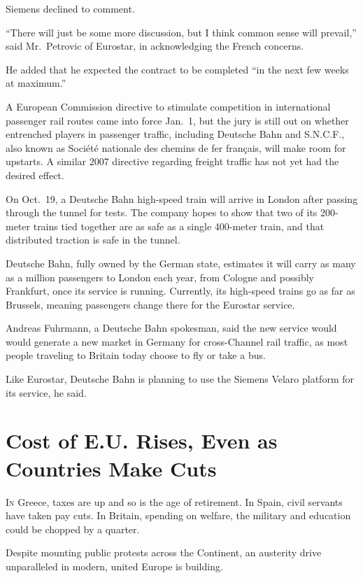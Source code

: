 ﻿\documentclass[12pt]{article}
\begin{document}
Siemens declined to comment.

``There will just be some more discussion, but I think common sense will prevail,'' said
Mr.~Petrovic of Eurostar, in acknowledging the French concerns.

He added that he expected the contract to be completed ``in the next few weeks at maximum.''

A European Commission directive to stimulate competition in international passenger rail routes came
into force Jan.~1, but the jury is still out on whether entrenched players in passenger traffic,
including Deutsche Bahn and S.N.C.F., also known as Soci\'et\'e nationale des chemins de fer
français, will make room for upstarts. A similar 2007 directive regarding freight traffic has not
yet had the desired effect.

On Oct.~19, a Deutsche Bahn high-speed train will arrive in London after passing through the tunnel
for tests. The company hopes to show that two of its 200-meter trains tied together are as safe as a
single 400-meter train, and that distributed traction is safe in the tunnel.

Deutsche Bahn, fully owned by the German state, estimates it will carry as many as a million
passengers to London each year, from Cologne and possibly Frankfurt, once its service is running.
Currently, its high-speed trains go as far as Brussels, meaning passengers change there for the
Eurostar service.

Andreas Fuhrmann, a Deutsche Bahn spokesman, said the new service would would generate a new market
in Germany for cross-Channel rail traffic, as most people traveling to Britain today choose to fly
or take a bus.

Like Eurostar, Deutsche Bahn is planning to use the Siemens Velaro platform for its service, he
said.


\section{Cost of E.U. Rises, Even as Countries Make Cuts}

\lettrine{I}{n} Greece, taxes are up and so is the age of retirement. In
Spain, civil servants have taken pay cuts. In Britain, spending on welfare, the military and
education could be chopped by a quarter.

Despite mounting public protests across the Continent, an austerity drive unparalleled in modern,
united Europe is building.
\end{document}
